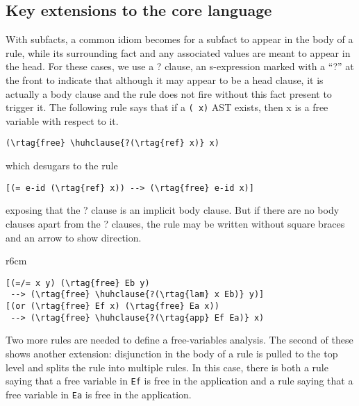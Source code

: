 
\renewcommand{\multicolsep}{3pt plus 1pt minus 1pt}

\renewcommand{\ulitleft}{\bf\ttfamily\frenchspacing}
\renewcommand{\ulitright}{}

\subsection{Key extensions to the core language}
\label{sec:semantics:extensions}
%
With subfacts, a common idiom becomes for a subfact to appear in the body of a rule, while its surrounding fact and any associated values are meant to appear in the head. For these cases, we use a ? clause, an s-expression marked with a ``?'' at the front to indicate that although it may appear to be a head clause, it is actually a body clause and the rule does not fire without this fact present to trigger it. The following rule says that if a \texttt{( x)} AST exists, then x is a free variable with respect to it.
%
\begin{Verbatim}[baselinestretch=0.75,commandchars=\\\{\}]
(\rtag{free} \huhclause{?(\rtag{ref} x)} x)
\end{Verbatim}
%
which desugars to the rule
%
\begin{Verbatim}[baselinestretch=0.75,commandchars=\\\{\}]
[(= e-id (\rtag{ref} x)) --> (\rtag{free} e-id x)]
\end{Verbatim}
%
exposing that the ? clause is an implicit body clause. But if there are
no body clauses apart from the ? clauses, the rule may be written without
square braces and an arrow to show direction.

\begin{wrapfigure}{r}{6cm}
\vspace{-0.25cm}
\begin{Verbatim}[baselinestretch=0.75,commandchars=\\\{\}]
[(=/= x y) (\rtag{free} Eb y)
 --> (\rtag{free} \huhclause{?(\rtag{lam} x Eb)} y)]
[(or (\rtag{free} Ef x) (\rtag{free} Ea x))
 --> (\rtag{free} \huhclause{?(\rtag{app} Ef Ea)} x)
\end{Verbatim}
\end{wrapfigure}
%
Two more rules are needed to define a free-variables analysis.
%
The second of these shows another extension: disjunction in the body of
a rule is pulled to the top level and splits the rule into multiple rules.
In this case, there is both a rule saying that a free variable in \texttt{Ef}
is free in the application and a rule saying that a free variable in \texttt{Ea}
is free in the application.

